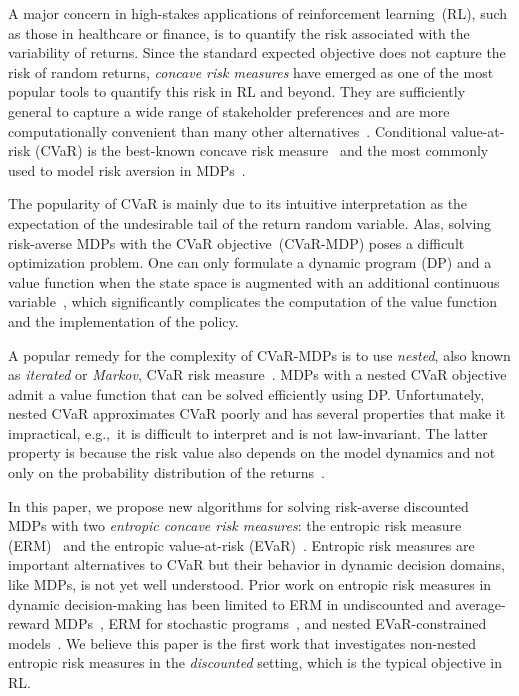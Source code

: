 \documentclass[twoside]{article}
\theoremstyle{plain}
\theoremstyle{definition}
\theoremstyle{remark}
\renewcommand{\cite}[1]{\citep{#1}}
\begin{document}
A major concern in high-stakes applications of reinforcement learning~(RL), such as those in healthcare or finance, is to quantify the risk associated with the variability of returns. Since the standard expected objective does not capture the risk of random returns, \emph{concave risk measures} have emerged as one of the most popular tools to quantify this risk in RL and beyond. They are sufficiently general to capture a wide range of stakeholder preferences and are more computationally convenient than many other alternatives~\cite{Follmer2016}. Conditional value-at-risk (CVaR) is the best-known concave risk measure~\cite{Follmer2016,Shapiro2014} and the most commonly used to model risk aversion in MDPs~\cite{Bauerle2022,Bauerle2011,Angelotti2021,Bisi2022,Brown2020,Chow14AC,Chow2015,Chow2018a,Lobo2021,Tamar2014,Tamar2015,Zhang2021a,Hiraoka2019,Santara2018,Osogami2012}.

The popularity of CVaR is mainly due to its intuitive interpretation as the expectation of the undesirable tail of the return random variable. Alas, solving risk-averse MDPs with the CVaR objective~(CVaR-MDP) poses a difficult optimization problem. One can only formulate a dynamic program (DP) and a value function when the state space is augmented with an additional continuous variable~\cite{Pflug2016,Pflug2016a,Bauerle2011,Li2022}, which significantly complicates the computation of the value function and the implementation of the policy.

A popular remedy for the complexity of CVaR-MDPs is to use \emph{nested}, also known as \emph{iterated} or \emph{Markov}, CVaR risk measure~\cite{Defourny2008,Osogami2011,Bauerle2022}. MDPs with a nested CVaR objective admit a value function that can be solved efficiently using DP. Unfortunately, nested CVaR approximates CVaR poorly and has several properties that make it impractical, e.g.,~it is difficult to interpret and is not law-invariant. The latter property is because the risk value also depends on the model dynamics and not only on the probability distribution of the returns~\cite{Follmer2016}.

In this paper, we propose new algorithms for solving risk-averse discounted MDPs with two \emph{entropic concave risk measures}: the entropic risk measure (ERM)~\cite{Follmer2016} and the entropic value-at-risk (EVaR)~\cite{Ahmadi-Javid2012,Follmer2016}. Entropic risk measures are important alternatives to CVaR but their behavior in dynamic decision domains, like MDPs, is not yet well understood. Prior work on entropic risk measures in dynamic decision-making has been limited to ERM in undiscounted and average-reward MDPs~\cite{Borkar2002a,neu2017unified}, ERM for stochastic programs~\cite{Dowson2021}, and nested EVaR-constrained models~\cite{Ahmadi2021a,Ahmadi2021b,Dixit2021}. We believe this paper is the first work that investigates non-nested entropic risk measures in the {\em discounted} setting, which is the typical objective in RL. 
\end{document}

